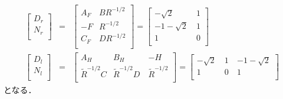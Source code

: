 \documentclass[a4paper,12pt]{jarticle}
\begin{document}
%
\begin{eqnarray}
 \left[
  \begin{array}{c}
   D_r  \\ 
   N_r   \\ 
  \end{array}
\right]
&=&
\left[
  \begin{array}{c|c}
   A_F & BR^{-1/2}  \\ \hline
  -F   & R^{-1/2}   \\
  C_F  & DR^{-1/2} \\
  \end{array}
\right]
=
\left[
  \begin{array}{c|c}
   -\sqrt{2} &~ 1  \\ \hline
  -1-\sqrt{2} &~ 1   \\
  1           &~0 \\ 
  \end{array}
\right]\\
 \left[
  \begin{array}{c}
   D_l  \\ 
   N_l   \\ 
  \end{array}
\right]
&=&
\left[
  \begin{array}{c|cc}
   A_H             & B_H               &-H \\ \hline
  \tilde{R}^{-1/2}C& \tilde{R}^{-1/2}D~& \tilde{R}^{-1/2} \\ 
  \end{array}
  \right]
=
\left[
  \begin{array}{c|cc}
   -\sqrt{2} &~ 1 ~&-1-\sqrt{2} \\ \hline
  1           &~ 0 ~& 1 \\ 
  \end{array}
  \right]
\end{eqnarray}
となる．
%
\end{document}
